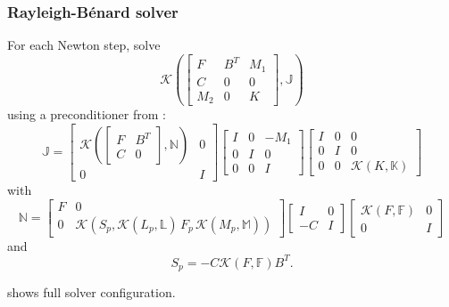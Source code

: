 \documentclass[presentation,aspectratio=43]{beamer}
\newcommand{\KSP}[2]{\ensuremath{\mathcal{K}\left(#1, \mathbb{#2}\right)}}
\newcommand{\ksp}[1]{\KSP{#1}{#1}}
\begin{document}
\begin{frame}
  \frametitle{Rayleigh-B\'enard solver}
  {\small
  For each Newton step, solve
  \begin{equation*}
    \KSP{\begin{bmatrix}
        F & B^T & M_1\\
        C & 0 & 0 \\
        M_2 & 0 & K
      \end{bmatrix}}{J}
  \end{equation*}
  using a preconditioner from \textcite{Howle:2012}:
  \begin{equation*}
    \mathbb{J} =
    \begin{bmatrix}
      \KSP{\begin{bmatrix}
          F & B^T\\
          C & 0
        \end{bmatrix}}{N} & 0\\
      0 & I
    \end{bmatrix}
    \begin{bmatrix}
      I & 0 & -M_1\\
      0 & I & 0 \\
      0 & 0 & I
    \end{bmatrix}
    \begin{bmatrix}
      I & 0 & 0\\
      0 & I & 0\\
      0 & 0 &\ksp{K}
    \end{bmatrix}
  \end{equation*}
  with
  \begin{equation*}
    \mathbb{N} = \begin{bmatrix}
      F & 0 \\
      0 & \mathcal{K}(S_p, \KSP{L_p}{L}\,F_p \, \KSP{M_p}{M})
    \end{bmatrix}
    \begin{bmatrix}
      I & 0\\
      -C & I
    \end{bmatrix}
    \begin{bmatrix}
      \ksp{F} & 0 \\
      0 & I
    \end{bmatrix}
  \end{equation*}
  and
  \begin{equation*}
    S_p = -C \ksp{F} B^T.
  \end{equation*}

  \begin{flushright}
    {\scriptsize \textcite[\S B.4]{Kirby:2018} shows full solver configuration.}
  \end{flushright}
  }
\end{frame}
\end{document}
